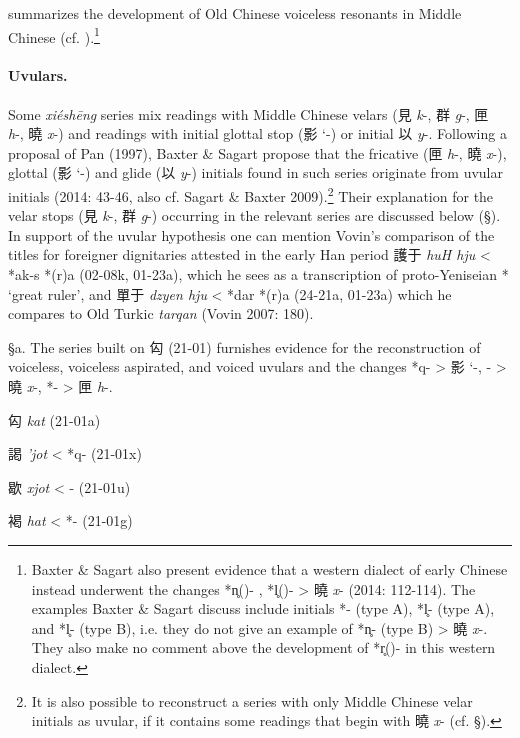 summarizes the development of Old Chinese voiceless resonants in Middle
Chinese (cf. \cite[112]{Baxter2014OldChinese}).\footnote{Baxter \& Sagart also
  present evidence that a western dialect of early Chinese instead
  underwent the changes *n̥({})- , *l̥({})- \textgreater{} 曉  \emph{x}-
  (2014: 112-114). The examples Baxter \& Sagart discuss include
  initials *{}- (type A), *l̥{}- (type A), and *l̥- (type B), i.e. they do
  not give an example of *n̥- (type B) \textgreater{} 曉  \emph{x}-. They
  also make no comment above the development of *r̥({})- in this western
  dialect.}

\paragraph{Uvulars.} Some  \emph{xiéshēng}
series mix readings with Middle Chinese velars (見  \emph{k}-, 群
 \emph{g}-, 匣~ \emph{h}-, 曉  \emph{x}-) and readings with initial glottal
stop (影 `-) or initial 以  \emph{y}-. Following a proposal of Pan
(1997), Baxter \& Sagart propose that the fricative (匣  \emph{h}-, 曉
 \emph{x}-), glottal (影 `-) and glide (以  \emph{y}-) initials found in
such series originate from uvular initials (2014: 43-46, also cf. 
Sagart
\& Baxter 2009).\footnote{It is also possible to reconstruct a series
  with only Middle Chinese velar initials as uvular, if it contains some
  readings that begin with 曉  \emph{x}- (cf. §). } Their explanation for
the velar stops (見  \emph{k}-, 群  \emph{g}-) occurring in the relevant
series are discussed below (§). In support of the uvular hypothesis one
can mention Vovin's comparison of the titles for foreigner dignitaries
attested in the early Han period 護于  \emph{huH hju} \textless{}
*{}ak-s *{}(r)a (02-08k, 01-23a), which he sees as a
transcription of proto-Yeniseian *{} `great ruler', and 單于
 \emph{dzyen hju} \textless{} *dar *{}(r)a (24-21a, 01-23a) which he
compares to Old Turkic \emph{tarqan} (Vovin 2007: 180).

§a. The series built on 匃 (21-01) furnishes evidence for the
reconstruction of voiceless, voiceless aspirated, and voiced uvulars and
the changes *q- \textgreater{} 影 `-, {}- \textgreater{} 曉  \emph{x}-,
*{}- \textgreater{} 匣 \emph{h}-.

\begin{description} \item
匃  \emph{kat} (21-01a)

\item
謁  \emph{'jot} \textless{} *q- (21-01x)

\item
歇  \emph{xjot} \textless{} {}- (21-01u)

\item
褐 \emph{hat} \textless{} *{}- (21-01g)
\end{description}


